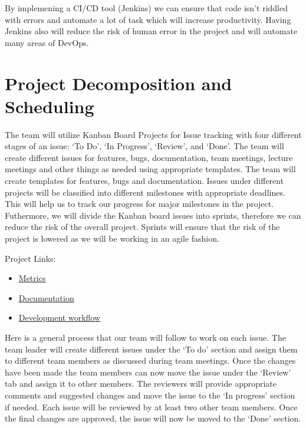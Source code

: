\documentclass{article}
\begin{document}
By implemening a CI/CD tool (Jenkins) we can ensure that code isn't riddled with errors and automate a lot of task which will increase productivity. Having Jenkins also will reduce the risk of human error in the project and will automate many areas of DevOps. 

\section{Project Decomposition and Scheduling}

The team will utilize Kanban Board Projects for Issue tracking with four different stages of an issue: ‘To Do’, ‘In Progress’, ‘Review’, and ‘Done’. The team will create different issues for features, bugs, documentation, team meetings, lecture meetings and other things as needed using appropriate templates. The team will create templates for features, bugs and documentation. Issues under different projects will be classified into different milestones with appropriate deadlines. This will help us to track our progress for major milestones in the project. 
Futhermore, we will divide the Kanban board issues into sprints, therefore we can reduce the risk of the overall project. Sprints will ensure that the risk of the project is lowered as we will be working in an agile fashion.

Project Links:
\begin{itemize}
\item  
\href{https://github.com/users/Inreet-Kaur/projects/4}{Metrics}
\item  
\href{https://github.com/users/Inreet-Kaur/projects/2}{Documentation} 
\item 
\href{https://github.com/users/Inreet-Kaur/projects/6}{Development workflow}
\end{itemize}

Here is a general process that our team will follow to work on each issue. The team leader will create different issues under the ‘To do’ section and assign them to different team members as discussed during team meetings. Once the changes have been made the team members can now move the issue under the ‘Review’ tab and assign it to other members. The reviewers will provide appropriate comments and suggested changes and move the issue to the ‘In progress’ section if needed. Each issue will be reviewed by at least two other team members. Once the final changes are approved, the issue will now be moved to the ‘Done’ section. 
\end{document}
